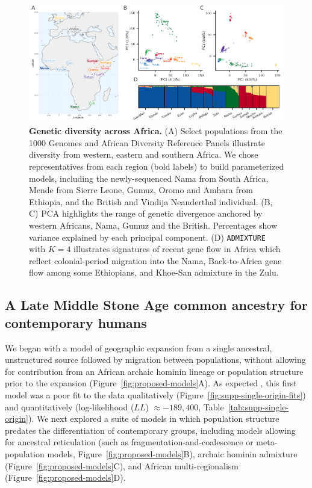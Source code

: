 \documentclass[]{article}
\begin{document}
\begin{figure}[ht!]
    \centering
    \includegraphics{figures/samples-diversity.pdf}
    \caption[width=\textwidth]{
        \textbf{Genetic diversity across Africa.}
        (A) Select populations from the 1000 Genomes and African Diversity Reference Panels
        illustrate diversity from western, eastern and southern Africa.
        We chose representatives from each region (bold labels)
        to build parameterized models,
        including the newly-sequenced Nama from South Africa, Mende
        from Sierre Leone, Gumuz, Oromo and Amhara from Ethiopia, and the
        British and Vindija Neanderthal individual.
        (B, C) PCA highlights the range of genetic divergence anchored 
        by western Africans, Nama, Gumuz and the British.
        Percentages show variance explained by each principal component.
        (D) \texttt{ADMIXTURE} with $K=4$ illustrates signatures of recent gene flow in Africa
        which reflect colonial-period migration into the Nama,
        Back-to-Africa gene flow among some Ethiopians, and Khoe-San admixture in the Zulu.
    }
    \label{fig:diversity}
\end{figure}
   
\subsection*{A Late Middle Stone Age common ancestry for contemporary humans}

We began with a model of geographic expansion from a single ancestral,
unstructured source followed by migration between populations, without allowing
for contribution from an African archaic hominin lineage or population structure prior
to the expansion (Figure~\ref{fig:proposed-models}A). As expected
\citep{Ragsdale2019-nt}, this first model was a poor fit to the data
qualitatively (Figure~\ref{fig:supp-single-origin-fits}) and quantitatively
(log-likelihood ($LL$) $\approx -189,400$, Table~\ref{tab:supp-single-origin}).
We next explored a suite of models in which population structure predates the
differentiation of contemporary groups, including models allowing for ancestral
reticulation (such as fragmentation-and-coalescence or meta-population models,
Figure~\ref{fig:proposed-models}B), archaic hominin admixture
(Figure~\ref{fig:proposed-models}C), and African multi-regionalism
(Figure~\ref{fig:proposed-models}D).
\end{document}
